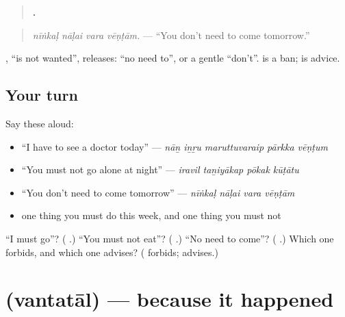 \begin{quote}
\textbf{   .}
\end{quote}

\begin{quote}
\emph{nīṅkaḷ nāḷai vara vēṇṭām.} — \textquotedblleft{}You don't need to come tomorrow.\textquotedblright{}
\end{quote}

\textbf{}, \textquotedblleft{}is not wanted\textquotedblright{}, releases: \textquotedblleft{}no need to\textquotedblright{}, or a gentle \textquotedblleft{}don't\textquotedblright{}. \textbf{} is a ban; \textbf{} is advice.

\subsection*{Your turn}
Say these aloud:

\begin{itemize}
\raggedright
  \item \textquotedblleft{}I have to see a doctor today\textquotedblright{} — \emph{nāṉ iṉṟu maruttuvaraip pārkka vēṇṭum}
  \item \textquotedblleft{}You must not go alone at night\textquotedblright{} — \emph{iravil taṉiyākap pōkak kūṭātu}
  \item \textquotedblleft{}You don't need to come tomorrow\textquotedblright{} — \emph{nīṅkaḷ nāḷai vara vēṇṭām}
  \item one thing you must do this week, and one thing you must not
\end{itemize}

\begin{tcolorbox}[breakable,colback=teal!4,colframe=teal!35!black,title={Before you move on}]
\textquotedblleft{}I must go\textquotedblright{}? (\textbf{  }.) \textquotedblleft{}You must not eat\textquotedblright{}? (\textbf{ }.) \textquotedblleft{}No need to come\textquotedblright{}? (\textbf{ }.) Which one forbids, and which one advises? (\textbf{} forbids; \textbf{} advises.)
\end{tcolorbox}
\section[\texorpdfstring{\ta{வந்ததால்} (vantatāl)}{வந்ததால் (vantatāl)}]{ (vantatāl) — because it happened}

